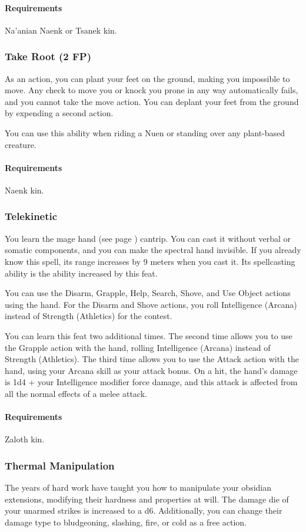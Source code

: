    \paragraph{Requirements} Na'anian Naenk or Tsanek kin.
\subsubsection{Take Root (2 FP)} \label{feat::takeroot}
    As an action, you can plant your feet on the ground, making you impossible to move.
    Any check to move you or knock you prone in any way automatically fails, and you cannot take the move action.
    You can deplant your feet from the ground by expending a second action.

    You can use this ability when riding a Nuen or standing over any plant-based creature.
    \paragraph{Requirements} Naenk kin.
\subsubsection{Telekinetic} \label{feat::telekinetic}
    You learn the mage hand (see page \pageref{spell:magehand}) cantrip.
    You can cast it without verbal or somatic components, and you can make the spectral hand invisible.
    If you already know this spell, its range increases by 9 meters when you cast it.
    Its spellcasting ability is the ability increased by this feat.

    You can use the Disarm, Grapple, Help, Search, Shove, and Use Object actions using the hand.
    For the Disarm and Shove actions, you roll Intelligence (Arcana) instead of Strength (Athletics) for the contest.

    You can learn this feat two additional times.
    The second time allows you to use the Grapple action with the hand, rolling Intelligence (Arcana) instead of Strength (Athletics).
    The third time allows you to use the Attack action with the hand, using your Arcana skill as your attack bonus.
    On a hit, the hand's damage is 1d4 + your Intelligence modifier force damage, and this attack is affected from all the normal effects of a melee attack.
    \paragraph{Requirements} Zaloth kin.
\subsubsection{Thermal Manipulation} \label{feat::thermalmanipulation}
    The years of hard work have taught you how to manipulate your obsidian extensions, modifying their hardness and properties at will.
    The damage die of your unarmed strikes is increased to a d6.
    Additionally, you can change their damage type to bludgeoning, slashing, fire, or cold as a free action.

